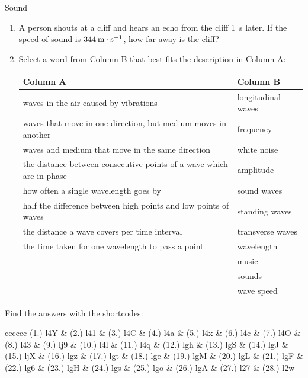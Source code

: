 \begin{eocexercises}{Sound}
\begin{enumerate}[noitemsep, label=\textbf{\arabic*}. ]
\label{m38783*uid44}\item A person shouts at a cliff and hears an echo from the cliff 1~s later. If the speed of sound is $344\phantom{\rule{2pt}{0ex}}\text{m}\ensuremath{\cdot}\text{s}{}^{-1}$, how far away is the cliff?\newline
\label{m38783*uid37}\item Select a word from Column B that best fits the description in Column A:
          \begin{center}
\begin{tabular}{ll}
\textbf{Column A} & \textbf{Column B} \\ \hline
waves in the air caused by vibrations & longitudinal waves \\
waves that move in one direction, but medium moves in another & frequency \\
waves and medium that move in the same direction & white noise \\
the distance between consecutive points of a wave which are in phase & amplitude \\
how often a single wavelength goes by & sound waves \\
half the difference between high points and low points of waves & standing waves \\
the distance a wave covers per time interval & transverse waves \\
the time taken for one wavelength to pass a point & wavelength \\
& music \\
& sounds \\
& wave speed \\
\end{tabular}
\end{center}
\end{enumerate}
  \label{m38800**end}
  \label{9b5d72dd5f0585e544578ab90a9956a8**end}
\par {} Find the answers with the shortcodes:
 \par \begin{tabular}[h]{cccccc}
 (1.) l4Y  &  (2.) l41  &  (3.) l4C  &  (4.) l4a  &  (5.) l4x  &  (6.) l4c  &  (7.) l4O  &  (8.) l43  &  (9.) lj9  &  (10.) l4l  &  (11.) l4q  &  (12.) lgh  &  (13.) lgS  &  (14.) lgJ  &  (15.) ljX  &  (16.) lgz  &  (17.) lgt  &  (18.) lge  &  (19.) lgM  &  (20.) lgL  &  (21.) lgF  &  (22.) lg6  &  (23.) lgH  &  (24.) lgs  &  (25.) lgo  &  (26.) lgA  & (27.) l27 & (28.) l2w  \end{tabular}

\end{eocexercises}
